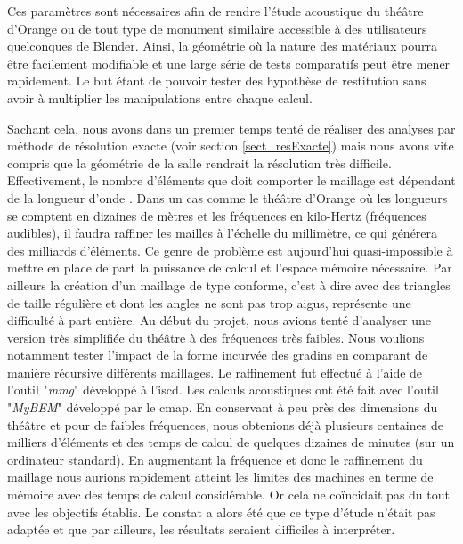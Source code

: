 Ces paramètres sont nécessaires afin de rendre l'étude acoustique du théâtre d'Orange ou de tout type de monument similaire accessible à des utilisateurs quelconques de Blender. Ainsi, la géométrie où la nature des matériaux pourra être facilement modifiable et une large série de tests comparatifs peut être mener rapidement. Le but étant de pouvoir tester des hypothèse de restitution sans avoir à multiplier les manipulations entre chaque calcul.


Sachant cela, nous avons dans un premier temps tenté de réaliser des analyses par méthode de résolution exacte (voir section \ref{sect_resExacte}) mais nous avons vite compris que la géométrie de la salle rendrait la résolution très difficile. Effectivement, le nombre d'éléments que doit comporter le maillage est dépendant de la longueur d'onde \cite[p. 740]{beamtracing}. Dans un cas comme le théâtre d'Orange où les longueurs se comptent en dizaines de mètres et les fréquences en kilo-Hertz (fréquences audibles), il faudra raffiner les mailles à l'échelle du millimètre, ce qui générera des milliards d'éléments. Ce genre de problème est aujourd'hui quasi-impossible à mettre en place de part la puissance de calcul et l'espace mémoire nécessaire. Par ailleurs la création d'un maillage de type conforme, c'est à dire avec des triangles de taille régulière et dont les angles ne sont pas trop aigus, représente une difficulté à part entière.
Au début du projet, nous avions tenté d'analyser une version très simplifiée du théâtre à des fréquences très faibles. Nous voulions notamment tester l'impact de la forme incurvée des gradins en comparant de manière récursive différents maillages. Le raffinement fut effectué à l'aide de l'outil "\textit{mmg}" développé à l'\gls{iscd}. Les calculs acoustiques ont été fait avec l'outil "\textit{MyBEM}" développé par le \gls{cmap}. En conservant à peu près des dimensions du théâtre et pour de faibles fréquences, nous obtenions déjà plusieurs centaines de milliers d'éléments et des temps de calcul de quelques dizaines de minutes (sur un ordinateur standard). En augmentant la fréquence et donc le raffinement du maillage nous aurions rapidement atteint les limites des machines en terme de mémoire avec des temps de calcul considérable. Or cela ne coïncidait pas du tout avec les objectifs établis. Le constat a alors été que ce type d'étude n'était pas adaptée et que par ailleurs, les résultats seraient difficiles à interpréter.

